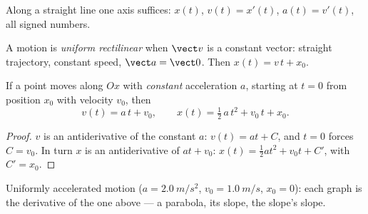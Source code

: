 Along a straight line one axis suffices: $x(t)$, $v(t) = x'(t)$,
$a(t) = v'(t)$, all signed numbers.

\begin{definition}\label{def:g12:kinematics-2d:uniform}
A motion is \emph{uniform rectilinear} when $\vect v$ is a constant vector: straight trajectory,
constant speed, $\vect a = \vect 0$. Then $x(t) = v\,t + x_0$.
\end{definition}

\begin{proposition}\label{prop:g12:kinematics-2d:uarm}
%
If a point moves along $Ox$ with \emph{constant} acceleration $a$,
starting at $t = 0$ from position $x_0$ with velocity $v_0$, then
\[
v(t) = a\,t + v_0,
\qquad
x(t) = \tfrac12\,a\,t^2 + v_0\,t + x_0 .
\]
\end{proposition}

\begin{proof}
$v$ is an antiderivative of the constant $a$: $v(t) = a t + C$, and
$t = 0$ forces $C = v_0$. In turn $x$ is an antiderivative of
$a t + v_0$: $x(t) = \tfrac12 a t^2 + v_0 t + C'$, with $C' = x_0$.
\end{proof}

\begin{omfigure}

{\small Uniformly accelerated motion ($a = \qty{2.0}{m/s^2}$,
$v_0 = \qty{1.0}{m/s}$, $x_0 = 0$): each graph is the derivative of
the one above --- a parabola, its slope, the slope's slope.}
\end{omfigure}

